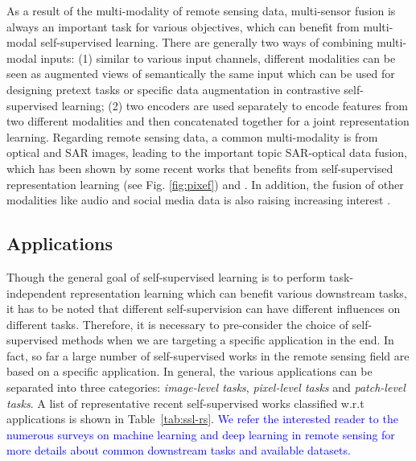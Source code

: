 \documentclass[lettersize,journal]{IEEEtran}
\begin{document}
As a result of the multi-modality of remote sensing data, multi-sensor fusion is always an important task for various objectives, which can benefit from multi-modal self-supervised learning. There are generally two ways of combining multi-modal inputs: (1) similar to various input channels, different modalities can be seen as augmented views of semantically the same input which can be used for designing pretext tasks or specific data augmentation in contrastive self-supervised learning; (2) two encoders are used separately to encode features from two different modalities and then concatenated together for a joint representation learning. Regarding remote sensing data, a common multi-modality is from optical and SAR images, leading to the important topic SAR-optical data fusion, which has been shown by some recent works that benefits from self-supervised representation learning \cite{chen2021self0} (see Fig. \ref{fig:pixef}) and \cite{wang2022self}. In addition, the fusion of other modalities like audio and social media data is also raising increasing interest \cite{heidler2021self}.







\subsection{Applications}

Though the general goal of self-supervised learning is to perform task-independent representation learning which can benefit various downstream tasks, it has to be noted that different self-supervision can have different influences on different tasks. Therefore, it is necessary to pre-consider the choice of self-supervised methods when we are targeting a specific application in the end. In fact, so far a large number of self-supervised works in the remote sensing field are based on a specific application. In general, the various applications can be separated into three categories: \textit{image-level tasks}, \textit{pixel-level tasks} and \textit{patch-level tasks}. A list of representative recent self-supervised works classified w.r.t applications is shown in Table~\ref{tab:ssl-rs}. \textcolor{blue}{We refer the interested reader to the numerous surveys on machine learning and deep learning in remote sensing \cite{zhu2017deep, ma2019deep, li2018deep, yuan2021review, khelifi2020deep, signoroni2019deep, zhu2021deep} for more details about common downstream tasks and available datasets.}
\end{document}
